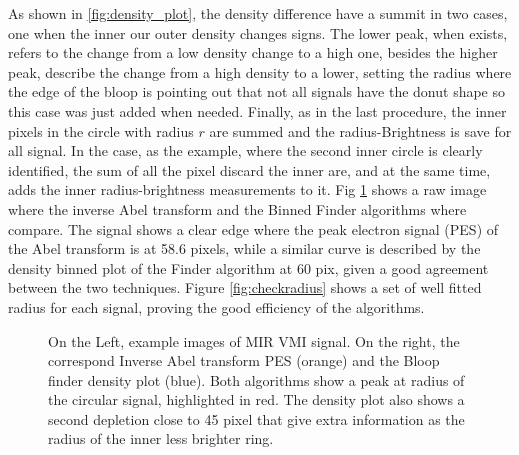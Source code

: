 As shown in \ref{fig:density_plot}, the density difference have a summit in two cases, one when the inner our outer density changes signs. The lower peak, when exists, refers to the change from a low density change to a high one, besides the higher peak, describe the change from a high density to a lower, setting the radius where the edge of the bloop is pointing out that not all signals have the donut shape so this case was just added when needed. Finally, as in the last procedure, the inner pixels in the circle with radius $r$ are summed and the radius-Brightness is save for all signal. In the case, as the example, where the second inner circle is clearly identified, the sum of all the pixel discard the inner are, and at the same time, adds the inner radius-brightness measurements to it. 
Fig \ref{fig:abelfinder} shows a raw image where the inverse Abel transform and the Binned Finder algorithms where compare. The signal shows a clear edge where the peak electron signal (PES) of the Abel transform is at 58.6 pixels, while a similar curve is described by the density binned plot of the Finder algorithm at 60 pix, given a good agreement between the two techniques.
Figure \ref{fig:checkradius} shows a set of well fitted radius for each signal, proving the good efficiency of the algorithms. 

\begin{figure}[hbtp!]
\centering
{} 
\caption[Fit-Abel transform agreement]{On the Left, example images of MIR VMI signal. On the right, the correspond Inverse Abel transform PES (orange) and the Bloop finder density plot (blue). Both algorithms show a peak at radius of the circular signal, highlighted in red. The density plot also shows a second depletion close to 45 pixel that give extra information as the radius of the inner less brighter ring. }
\label{fig:abelfinder}
\end{figure}


